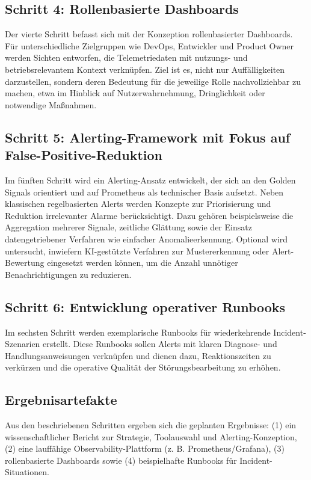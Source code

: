 \subsection{Schritt 4: Rollenbasierte Dashboards}
Der vierte Schritt befasst sich mit der Konzeption rollenbasierter Dashboards. Für unterschiedliche Zielgruppen wie DevOps, Entwickler und Product Owner werden Sichten entworfen, die Telemetriedaten mit nutzungs- und betriebsrelevantem Kontext verknüpfen. Ziel ist es, nicht nur Auffälligkeiten darzustellen, sondern deren Bedeutung für die jeweilige Rolle nachvollziehbar zu machen, etwa im Hinblick auf Nutzerwahrnehmung, Dringlichkeit oder notwendige Maßnahmen.

\subsection{Schritt 5: Alerting-Framework mit Fokus auf False-Positive-Reduktion}
Im fünften Schritt wird ein Alerting-Ansatz entwickelt, der sich an den Golden Signals orientiert und auf Prometheus als technischer Basis aufsetzt. Neben klassischen regelbasierten Alerts werden Konzepte zur Priorisierung und Reduktion irrelevanter Alarme berücksichtigt. Dazu gehören beispielsweise die Aggregation mehrerer Signale, zeitliche Glättung sowie der Einsatz datengetriebener Verfahren wie einfacher Anomalieerkennung. Optional wird untersucht, inwiefern KI-gestützte Verfahren zur Mustererkennung oder Alert-Bewertung eingesetzt werden können, um die Anzahl unnötiger Benachrichtigungen zu reduzieren.

\subsection{Schritt 6: Entwicklung operativer Runbooks}
Im sechsten Schritt werden exemplarische Runbooks für wiederkehrende Incident-Szenarien erstellt. Diese Runbooks sollen Alerts mit klaren Diagnose- und Handlungsanweisungen verknüpfen und dienen dazu, Reaktionszeiten zu verkürzen und die operative Qualität der Störungsbearbeitung zu erhöhen.

\subsection{Ergebnisartefakte}
Aus den beschriebenen Schritten ergeben sich die geplanten Ergebnisse: (1) ein wissenschaftlicher Bericht zur Strategie, Toolauswahl und Alerting-Konzeption, (2) eine lauffähige Observability-Plattform (z. B.  Prometheus/Grafana), (3) rollenbasierte Dashboards sowie (4) beispielhafte Runbooks für Incident-Situationen.



